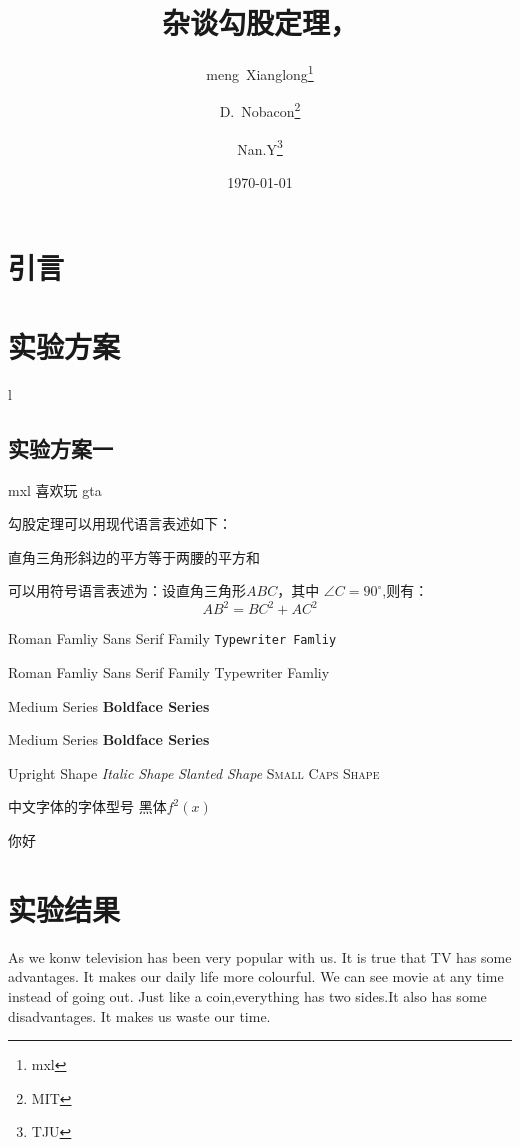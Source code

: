 \documentclass{ctexart}
\author{meng~Xianglong\footnote{mxl} \and D.~Nobacon\footnote{MIT} \and Nan.Y\footnote{TJU}}
\title{\kaishu 杂谈勾股定理，\eat}
\date{\today}
\newcommand{\play}[2]{#1 喜欢玩 #2 \par}
\begin{document}
\maketitle
\tableofcontents

	\section{引言}
	\section{实验方案}l
	\subsection{实验方案一}
	\play{mxl}{gta}
	勾股定理可以用现代语言表述如下：
	
	直角三角形斜边的平方等于两腰的平方和
	
	可以用符号语言表述为：设直角三角形$ABC$，其中 $\angle C=90^\circ$,则有：
	\begin{equation}
		AB^2=BC^2+AC^2
	\end{equation}
	
	\textrm{Roman Famliy} \textsf{Sans Serif Family} \texttt{Typewriter Famliy}
	
	\rmfamily Roman Famliy {\sffamily Sans Serif Family} {\ttfamily Typewriter Famliy}
	
	\textmd{Medium Series}  \textbf{Boldface Series}%
	
	{\mdseries Medium Series} {\bfseries Boldface Series}
	
	{\upshape Upright Shape} {\itshape Italic Shape}  {\slshape Slanted Shape} {\scshape Small Caps Shape}
	
	中文字体的字体型号 {\heiti 黑体}$f^2(x)$
	
	 你好
	\section{实验结果}
	As we konw television has been very popular with us.
	It is true that TV has some advantages. It makes our daily life more colourful.
	We can see movie at any time instead of going out.
	Just like a coin,everything has two sides.It also has some disadvantages.
	It makes us waste our time. 
	
\end{document}
